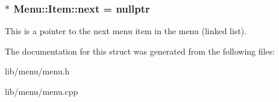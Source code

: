 \subsubsection[{\texorpdfstring{next}{next}}]{$\ast$ Menu\+::\+Item\+::next = nullptr}\hypertarget{struct_menu_1_1_item_aadcc1e4e824296c6b72ac7d053f06869}{}\label{struct_menu_1_1_item_aadcc1e4e824296c6b72ac7d053f06869}
This is a pointer to the next menu item in the menu (linked list). 

The documentation for this struct was generated from the following files\+:\begin{DoxyCompactItemize}
\item 
lib/menu/menu.\+h\item 
lib/menu/menu.\+cpp\end{DoxyCompactItemize}
